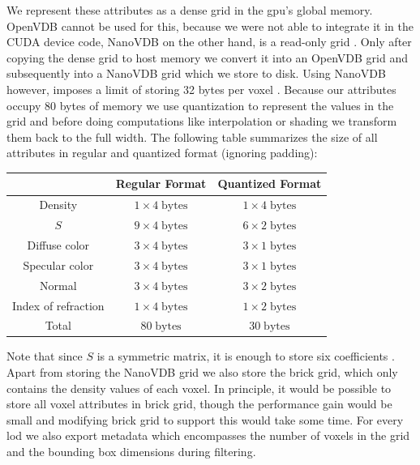 We represent these attributes as a dense grid in the \acs{gpu}'s global memory.
OpenVDB cannot be used for this, because we were not able to integrate it in the CUDA device code, NanoVDB on the other hand, is a read-only grid \cite{nanovdb}.
Only after copying the dense grid to host memory we convert it into an OpenVDB grid and subsequently into a NanoVDB grid which we store to disk.
Using NanoVDB however, imposes a limit of storing 32 bytes per voxel \cite{open_to_nanovdb}.
Because our attributes occupy 80 bytes of memory we use quantization to represent the values in the grid and before doing computations like interpolation or shading we transform them back to the full width.
The following table summarizes the size of all attributes in regular and quantized format (ignoring padding):
\begin{center}
    \begin{tabular}{| c | c | c | }
        \hline
         & Regular Format & Quantized Format \\
         \hline
         Density & $1\times 4\;\text{bytes}$ & $1\times 4\;\text{bytes}$ \\
         \hline
         $S$ & $9\times 4\;\text{bytes}$ & $6\times 2\;\text{bytes}$ \\
         \hline
         Diffuse color & $3\times 4\;\text{bytes}$ & $3\times 1\;\text{bytes}$ \\
         \hline
         Specular color & $3\times 4\;\text{bytes}$ & $3\times 1\;\text{bytes}$ \\
         \hline
         Normal & $3\times 4\;\text{bytes}$ & $3\times 2\;\text{bytes}$ \\
         \hline
         Index of refraction & $1\times 4\;\text{bytes}$ & $1\times 2\;\text{bytes}$ \\
         \thickhline
         Total & $80\;\text{bytes}$ & $30\;\text{bytes}$ \\
         \hline
    \end{tabular}
\end{center}
Note that since $S$ is a symmetric matrix, it is enough to store six coefficients \cite{sggx}.
Apart from storing the NanoVDB grid we also store the brick grid, which only contains the density values of each voxel.
In principle, it would be possible to store all voxel attributes in brick grid, though the performance gain would be small and modifying brick grid to support this would take some time.
For every \ac{lod} we also export metadata which encompasses the number of voxels in the grid and the bounding box dimensions during filtering.

